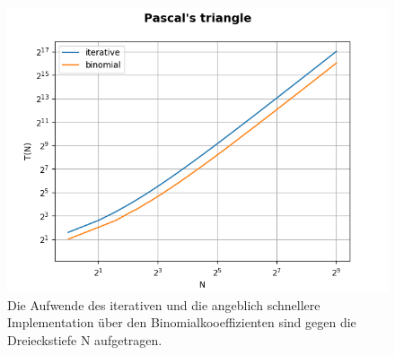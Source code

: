 \documentclass[
   draft=false
  ,paper=a4
  ,twoside=false
  ,fontsize=11pt
  ,headsepline
  ,DIV11
  ,parskip=full+
]{scrartcl} %
\begin{document}
\begin{figure}[htp]
	\label{fig:iterfast}
  	\centering
    \includegraphics[width=\textwidth]{./IMG/iterfast.png}
    \caption[iter fast]{Die Aufwende des iterativen und die angeblich schnellere Implementation über den Binomialkooeffizienten sind gegen die Dreieckstiefe N aufgetragen.}
\end{figure}
\end{document}
